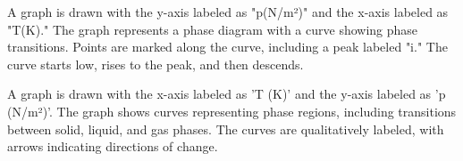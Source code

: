 A graph is drawn with the y-axis labeled as "p(N/m²)" and the x-axis labeled as "T(K)." The graph represents a phase diagram with a curve showing phase transitions. Points are marked along the curve, including a peak labeled "i." The curve starts low, rises to the peak, and then descends.

A graph is drawn with the x-axis labeled as 'T (K)' and the y-axis labeled as 'p (N/m²)'. The graph shows curves representing phase regions, including transitions between solid, liquid, and gas phases. The curves are qualitatively labeled, with arrows indicating directions of change.